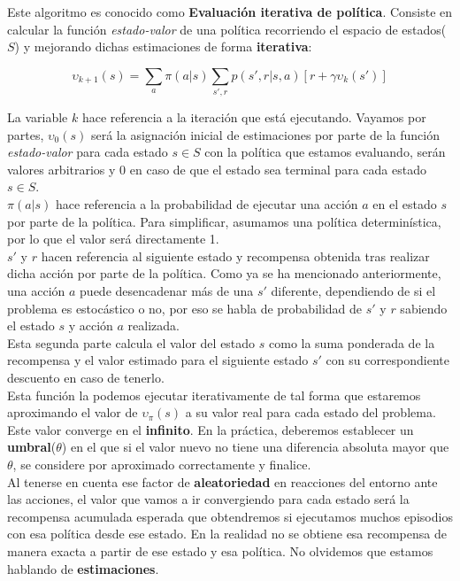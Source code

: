 \documentclass[11pt,fleqn]{book} %
\begin{document}
Este algoritmo es conocido como \textbf{Evaluación iterativa de política}. Consiste en calcular la función \textit{estado-valor} de una política recorriendo el espacio de estados($S$) y mejorando dichas estimaciones de forma \textbf{iterativa}:

\begin{equation*}
\upsilon_{k+1}(s)=\sum_a\pi(a|s) \sum_{s',r}p(s',r|s,a)\left[r+\gamma\upsilon_k(s')\right]
\end{equation*}

La variable $k$ hace referencia a la iteración que está ejecutando. Vayamos por partes, $\upsilon_0(s)$ será la asignación inicial de estimaciones por parte de la función \textit{estado-valor} para cada estado $s \in S$ con la política que estamos evaluando, serán valores arbitrarios y 0 en caso de que el estado sea terminal para cada estado $s \in S$. \\

$\pi(a|s)$ hace referencia a la probabilidad de ejecutar una acción $a$ en el estado $s$ por parte de la política. Para simplificar, asumamos una política determinística, por lo que el valor será directamente 1. \\

$s'$ y $r$ hacen referencia al siguiente estado y recompensa obtenida tras realizar dicha acción por parte de la política. Como ya se ha mencionado anteriormente, una acción $a$ puede desencadenar más de una $s'$ diferente, dependiendo de si el problema es estocástico o no, por eso se habla de probabilidad de $s'$ y $r$ sabiendo el estado $s$ y acción $a$ realizada. \\

Esta segunda parte calcula el valor del estado $s$ como la suma ponderada de la recompensa  y el valor estimado para el siguiente estado $s'$ con su correspondiente descuento en caso de tenerlo. \\

Esta función la podemos ejecutar iterativamente de tal forma que estaremos aproximando el valor de $\upsilon_\pi(s)$ a su valor real para cada estado del problema. Este valor converge en el \textbf{infinito}. En la práctica, deberemos establecer un \textbf{umbral}($\theta$) en el que si el valor nuevo no tiene una diferencia absoluta mayor que $\theta$, se considere por aproximado correctamente y finalice. \\

Al tenerse en cuenta ese factor de \textbf{aleatoriedad} en reacciones del entorno ante las acciones, el valor que vamos a ir convergiendo para cada estado será la recompensa acumulada esperada que obtendremos si ejecutamos muchos episodios con esa política desde ese estado. En la realidad no se obtiene esa recompensa de manera exacta a partir de ese estado y esa política. No olvidemos que estamos hablando de \textbf{estimaciones}. \\
\end{document}

